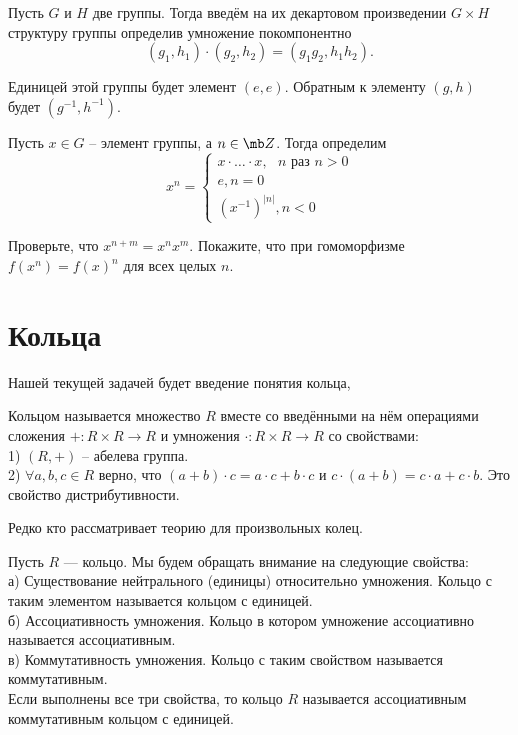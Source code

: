  Пусть $G$ и $H$ две группы. Тогда введём на  их декартовом произведении $G\times H$ структуру группы определив умножение покомпонентно 
$$(g_1,h_1)\cdot(g_2,h_2)=(g_1g_2, h_1h_2).$$
\edfn


\rm Единицей этой группы будет элемент $(e,e)$. Обратным к элементу $(g,h)$ будет $(g^{-1},h^{-1})$.
\erm



\dfn Пусть $x \in G$ -- элемент группы, а $n\in \mb Z$. Тогда определим $$x^n=\begin{cases}
x\cdot \dots \cdot x, \text{ $n$ раз } n>0\\
e, n=0\\
(x^{-1})^{|n|}, n<0
\end{cases}$$
\edfn

\upr Проверьте, что $x^{n+m}=x^nx^m$. Покажите, что при гомоморфизме $f(x^n)=f(x)^n$ для всех целых $n$.
\eupr






\section{Кольца}

Нашей текущей задачей будет введение понятия кольца, 

\dfn[Кольцо] Кольцом называется множество $R$ вместе со введёнными на нём операциями сложения $+\colon R\times R \to R$ и умножения $\cdot \colon R \times R \to R$ со свойствами:\\
1) $(R,+)$ – абелева группа.\\
2) $\forall a,b,c \in R$ верно, что $(a+b)\cdot c= a\cdot c+ b\cdot c$ и  $c\cdot (a+b)= c\cdot a+ c\cdot b$. Это свойство дистрибутивности.
\edfn

Редко кто рассматривает теорию для произвольных колец.

 Пусть $R$ --- кольцо. Мы будем обращать внимание на следующие свойства:\\
а) Существование нейтрального (единицы) относительно умножения. Кольцо с таким элементом называется кольцом с единицей.\\
б) Ассоциативность умножения. Кольцо в котором умножение ассоциативно называется ассоциативным. \\
в) Коммутативность умножения. Кольцо с таким свойством называется коммутативным.\\
Если выполнены все три свойства, то кольцо $R$ называется ассоциативным коммутативным кольцом с единицей.
\edfn





